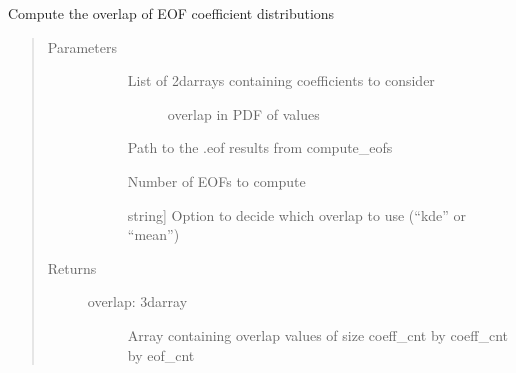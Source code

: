 \documentclass[letterpaper,10pt,english]{sphinxmanual}
\begin{document}
\begin{fulllineitems}
\label{\detokenize{stochprop.eofs:stochprop.eofs.compute_overlap}}
Compute the overlap of EOF coefficient distributions
\begin{quote}\begin{description}
\item[{Parameters}] \leavevmode\begin{description}
\item[{}] \leavevmode\begin{description}
\item[{List of 2darrays containing coefficients to consider}] \leavevmode
overlap in PDF of values

\end{description}

\item[{}] \leavevmode
Path to the .eof results from compute\_eofs

\item[{}] \leavevmode
Number of EOFs to compute

\item[{}] \leavevmode{[}string{]}
Option to decide which overlap to use (“kde” or “mean”)

\end{description}

\item[{Returns}] \leavevmode\begin{description}
\item[{overlap: 3darray}] \leavevmode
Array containing overlap values of size coeff\_cnt by coeff\_cnt by eof\_cnt

\end{description}

\end{description}\end{quote}

\end{fulllineitems}

\end{document}
